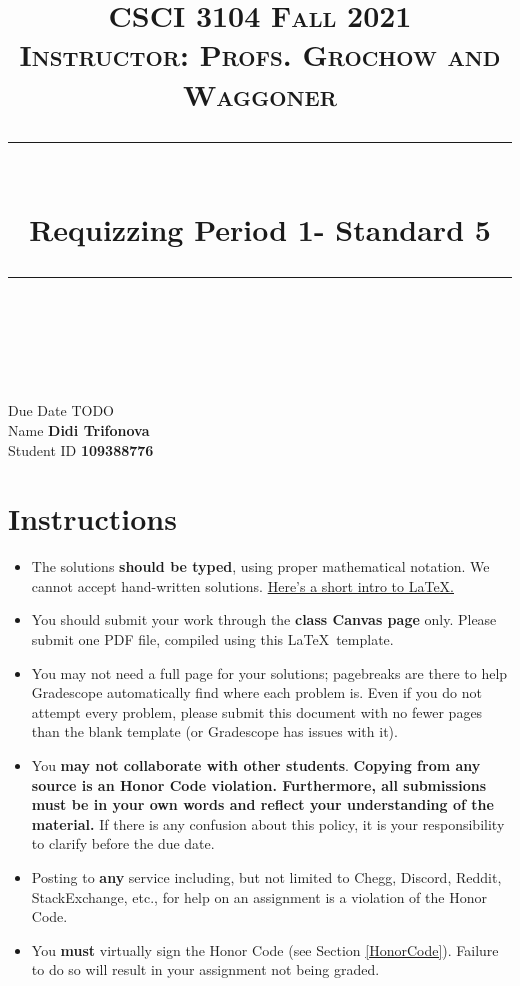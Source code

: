 \documentclass[11pt]{article}
\title{
\normalfont \normalsize 
\textsc{CSCI 3104 Fall 2021 \\ 
Instructor: Profs. Grochow and Waggoner} \\
[10pt] 
\rule{\linewidth}{0.5pt} \\[6pt] 
\huge Requizzing Period 1- Standard 5 \\
\rule{\linewidth}{2pt}  \\[10pt]
}
\date{}
\theoremstyle{definition}
\theoremstyle{definition}
\theoremstyle{definition}
\begin{document}
\maketitle


\noindent
Due Date \dotfill TODO \\
Name \dotfill \textbf{Didi Trifonova} \\
Student ID \dotfill \textbf{109388776} \\


\tableofcontents

\section{Instructions}
 \begin{itemize}
	\item The solutions \textbf{should be typed}, using proper mathematical notation. We cannot accept hand-written solutions. \href{http://ece.uprm.edu/~caceros/latex/introduction.pdf}{Here's a short intro to \LaTeX.}
	\item You should submit your work through the \textbf{class Canvas page} only. Please submit one PDF file, compiled using this \LaTeX \ template.
	\item You may not need a full page for your solutions; pagebreaks are there to help Gradescope automatically find where each problem is. Even if you do not attempt every problem, please submit this document with no fewer pages than the blank template (or Gradescope has issues with it).

	\item You \textbf{may not collaborate with other students}. \textbf{Copying from any source is an Honor Code violation. Furthermore, all submissions must be in your own words and reflect your understanding of the material.} If there is any confusion about this policy, it is your responsibility to clarify before the due date. 

	\item Posting to \textbf{any} service including, but not limited to Chegg, Discord, Reddit, StackExchange, etc., for help on an assignment is a violation of the Honor Code.

	\item You \textbf{must} virtually sign the Honor Code (see Section \ref{HonorCode}). Failure to do so will result in your assignment not being graded.
\end{itemize}
\end{document}

